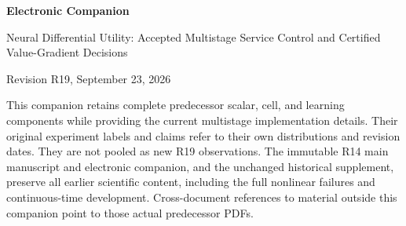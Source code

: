 \documentclass[11pt,letterpaper]{article}
\theoremstyle{definition}
\newcommand{\1}{\mathbf 1}
\begin{document}
\begin{center}{\Large\bfseries Electronic Companion\par}\medskip
{\large Neural Differential Utility: Accepted Multistage Service Control and Certified Value-Gradient Decisions\par}\medskip
Revision R19, September 23, 2026
\end{center}
This companion retains complete predecessor scalar, cell, and learning components while providing the current multistage implementation details. Their original experiment labels and claims refer to their own distributions and revision dates. They are not pooled as new R19 observations. The immutable R14 main manuscript and electronic companion, and the unchanged historical supplement, preserve all earlier scientific content, including the full nonlinear failures and continuous-time development. Cross-document references to material outside this companion point to those actual predecessor PDFs.









\clearpage
\end{document}

